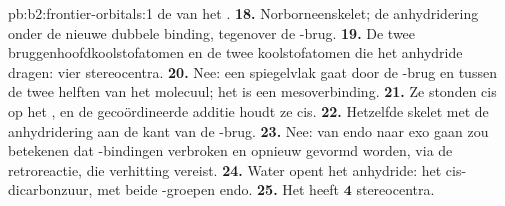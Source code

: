 \begin{solution}{pb:b2:frontier-orbitals:1}
de  van het .
\textbf{18.} Norborneenskelet; de anhydridering onder de nieuwe dubbele binding, tegenover de
-brug.
\textbf{19.} De twee bruggenhoofdkoolstofatomen en de twee koolstofatomen die het anhydride dragen: vier
stereocentra.
\textbf{20.} Nee: een spiegelvlak gaat door de -brug en tussen de twee helften
van het molecuul; het is een mesoverbinding.
\textbf{21.} Ze stonden cis op het , en de gecoördineerde additie houdt ze cis.
\textbf{22.} Hetzelfde skelet met de anhydridering aan de kant van de -brug.
\textbf{23.} Nee: van endo naar exo gaan zou betekenen dat -bindingen verbroken en opnieuw gevormd worden, via
de retroreactie, die verhitting vereist.
\textbf{24.} Water opent het anhydride: het cis-dicarbonzuur, met beide -groepen endo.
\textbf{25.} Het  heeft $\boldsymbol{4}$ stereocentra.
\end{solution}
